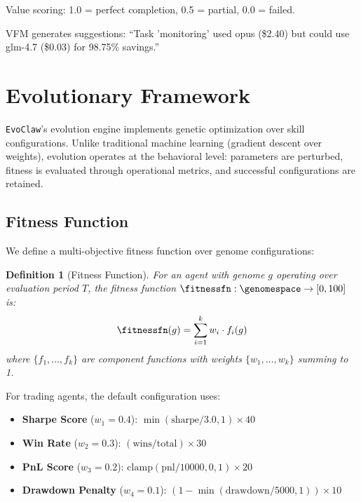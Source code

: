 \documentclass{article}
\newcommand{\evoclaw}{\texttt{EvoClaw}\xspace}
\newtheorem{definition}[theorem]{Definition}
\begin{document}
Value scoring: 1.0 = perfect completion, 0.5 = partial, 0.0 = failed.

VFM generates suggestions: ``Task 'monitoring' used opus (\$2.40) but could use glm-4.7 (\$0.03) for 98.75\% savings.''



\section{Evolutionary Framework}
\label{sec:evolution}

\evoclaw{}'s evolution engine implements genetic optimization over skill configurations. Unlike traditional machine learning (gradient descent over weights), evolution operates at the behavioral level: parameters are perturbed, fitness is evaluated through operational metrics, and successful configurations are retained.

\subsection{Fitness Function}

We define a multi-objective fitness function over genome configurations:

\begin{definition}[Fitness Function]
For an agent with genome $g$ operating over evaluation period $T$, the fitness function $\fitnessfn: \genomespace \to [0, 100]$ is:
\begin{equation}
\fitnessfn(g) = \sum_{i=1}^{k} w_i \cdot f_i(g)
\end{equation}
where $\{f_1, \ldots, f_k\}$ are component functions with weights $\{w_1, \ldots, w_k\}$ summing to 1.
\end{definition}

For trading agents, the default configuration uses:

\begin{itemize}[leftmargin=*]
    \item \textbf{Sharpe Score} ($w_1 = 0.4$): $\min(\text{sharpe}/3.0, 1) \times 40$
    \item \textbf{Win Rate} ($w_2 = 0.3$): $(\text{wins}/\text{total}) \times 30$
    \item \textbf{PnL Score} ($w_3 = 0.2$): $\text{clamp}(\text{pnl}/10000, 0, 1) \times 20$
    \item \textbf{Drawdown Penalty} ($w_4 = 0.1$): $(1 - \min(\text{drawdown}/5000, 1)) \times 10$
\end{itemize}
\end{document}
